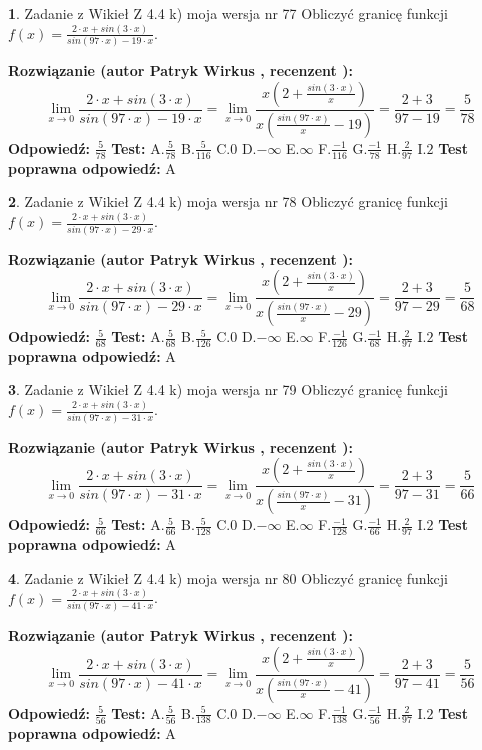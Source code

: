 \documentclass[12pt, a4paper]{article}
\theoremstyle{definition} %
\newtheorem{zad}{}
\newcommand{\zadStart}[1]{\begin{zad}#1\newline}
\newcommand{\zadStop}{\end{zad}}
\newcommand{\rozwStart}[2]{\noindent \textbf{Rozwiązanie (autor #1 , recenzent #2): }\newline}
\newcommand{\rozwStop}{\newline}
\newcommand{\odpStart}{\noindent \textbf{Odpowiedź:}\newline}
\newcommand{\odpStop}{\newline}
\newcommand{\testStart}{\noindent \textbf{Test:}\newline}
\newcommand{\testStop}{\newline}
\newcommand{\kluczStart}{\noindent \textbf{Test poprawna odpowiedź:}\newline}
\newcommand{\kluczStop}{\newline}
\begin{document}
\zadStart{Zadanie z Wikieł Z 4.4 k) moja wersja nr 77}
Obliczyć granicę funkcji $f(x)=\frac{2\cdot x +sin(3\cdot x)}{sin(97\cdot x) -19\cdot x}$.
\zadStop
\rozwStart{Patryk Wirkus}{}
$$\lim\limits_{x\to 0}\frac{2\cdot x +sin(3\cdot x)}{sin(97\cdot x) -19\cdot x}
=\lim\limits_{x\to 0}\frac{x(2+\frac{sin(3\cdot x)}{x})}{x(\frac{sin(97\cdot x)}{x}-19)}
=\frac{2+3}{97-19} = \frac{5}{78}$$
\rozwStop
\odpStart
$\frac{5}{78}$
\odpStop
\testStart
A.$\frac{5}{78}$
B.$\frac{5}{116}$
C.$0$
D.$-\infty$
E.$\infty$
F.$\frac{-1}{116}$
G.$\frac{-1}{78}$
H.$\frac{2}{97}$
I.$2$
\testStop
\kluczStart
A
\kluczStop



\zadStart{Zadanie z Wikieł Z 4.4 k) moja wersja nr 78}
Obliczyć granicę funkcji $f(x)=\frac{2\cdot x +sin(3\cdot x)}{sin(97\cdot x) -29\cdot x}$.
\zadStop
\rozwStart{Patryk Wirkus}{}
$$\lim\limits_{x\to 0}\frac{2\cdot x +sin(3\cdot x)}{sin(97\cdot x) -29\cdot x}
=\lim\limits_{x\to 0}\frac{x(2+\frac{sin(3\cdot x)}{x})}{x(\frac{sin(97\cdot x)}{x}-29)}
=\frac{2+3}{97-29} = \frac{5}{68}$$
\rozwStop
\odpStart
$\frac{5}{68}$
\odpStop
\testStart
A.$\frac{5}{68}$
B.$\frac{5}{126}$
C.$0$
D.$-\infty$
E.$\infty$
F.$\frac{-1}{126}$
G.$\frac{-1}{68}$
H.$\frac{2}{97}$
I.$2$
\testStop
\kluczStart
A
\kluczStop



\zadStart{Zadanie z Wikieł Z 4.4 k) moja wersja nr 79}
Obliczyć granicę funkcji $f(x)=\frac{2\cdot x +sin(3\cdot x)}{sin(97\cdot x) -31\cdot x}$.
\zadStop
\rozwStart{Patryk Wirkus}{}
$$\lim\limits_{x\to 0}\frac{2\cdot x +sin(3\cdot x)}{sin(97\cdot x) -31\cdot x}
=\lim\limits_{x\to 0}\frac{x(2+\frac{sin(3\cdot x)}{x})}{x(\frac{sin(97\cdot x)}{x}-31)}
=\frac{2+3}{97-31} = \frac{5}{66}$$
\rozwStop
\odpStart
$\frac{5}{66}$
\odpStop
\testStart
A.$\frac{5}{66}$
B.$\frac{5}{128}$
C.$0$
D.$-\infty$
E.$\infty$
F.$\frac{-1}{128}$
G.$\frac{-1}{66}$
H.$\frac{2}{97}$
I.$2$
\testStop
\kluczStart
A
\kluczStop



\zadStart{Zadanie z Wikieł Z 4.4 k) moja wersja nr 80}
Obliczyć granicę funkcji $f(x)=\frac{2\cdot x +sin(3\cdot x)}{sin(97\cdot x) -41\cdot x}$.
\zadStop
\rozwStart{Patryk Wirkus}{}
$$\lim\limits_{x\to 0}\frac{2\cdot x +sin(3\cdot x)}{sin(97\cdot x) -41\cdot x}
=\lim\limits_{x\to 0}\frac{x(2+\frac{sin(3\cdot x)}{x})}{x(\frac{sin(97\cdot x)}{x}-41)}
=\frac{2+3}{97-41} = \frac{5}{56}$$
\rozwStop
\odpStart
$\frac{5}{56}$
\odpStop
\testStart
A.$\frac{5}{56}$
B.$\frac{5}{138}$
C.$0$
D.$-\infty$
E.$\infty$
F.$\frac{-1}{138}$
G.$\frac{-1}{56}$
H.$\frac{2}{97}$
I.$2$
\testStop
\kluczStart
A
\kluczStop
\end{document}
